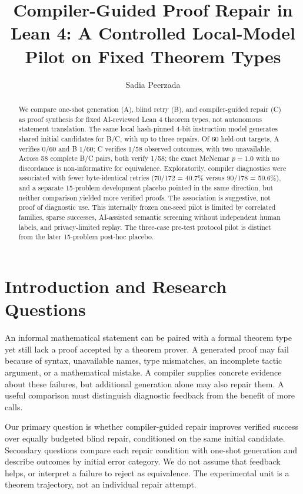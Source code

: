 \documentclass[runningheads,a4paper]{llncs}
\begin{document}
\title{Compiler-Guided Proof Repair in Lean 4: A Controlled Local-Model Pilot on Fixed Theorem Types}
\author{Sadia Peerzada}
\institute{}
\maketitle

\begin{abstract}
We compare one-shot generation (A), blind retry (B), and compiler-guided
repair (C) as proof synthesis for fixed AI-reviewed Lean 4 theorem types,
not autonomous statement translation. The same local hash-pinned 4-bit
instruction model generates shared initial candidates for B/C, with up to
three repairs. Of 60 held-out targets, A verifies 0/60 and B 1/60; C verifies
1/58 observed outcomes, with two unavailable. Across 58 complete B/C pairs,
both verify 1/58; the exact McNemar $p=1.0$ with no discordance is
non-informative for equivalence. Exploratorily, compiler diagnostics were
associated with fewer byte-identical retries (70/172 = 40.7\% versus
90/178 = 50.6\%), and a separate 15-problem development placebo pointed
in the same direction, but neither comparison yielded more verified proofs.
The association is suggestive, not proof of diagnostic use. This internally
frozen one-seed pilot is limited by correlated families, sparse successes,
AI-assisted semantic screening without independent human labels, and
privacy-limited replay. The three-case pre-test protocol pilot is distinct
from the later 15-problem post-hoc placebo.
\end{abstract}

\section{Introduction and Research Questions}
An informal mathematical statement can be paired with a formal theorem type
yet still lack a proof accepted by a theorem prover. A generated proof may fail
because of syntax, unavailable names, type mismatches, an incomplete tactic
argument, or a mathematical mistake. A compiler supplies concrete evidence about
these failures, but additional generation alone may also repair them. A useful
comparison must distinguish diagnostic feedback from the benefit of more calls.

Our primary question is whether compiler-guided repair improves verified
success over equally budgeted blind repair, conditioned on the same initial
candidate. Secondary questions compare each repair condition with one-shot
generation and describe outcomes by initial error category. We do not assume
that feedback helps, or interpret a failure to reject as equivalence. The
experimental unit is a theorem trajectory, not an individual repair attempt.
\end{document}
